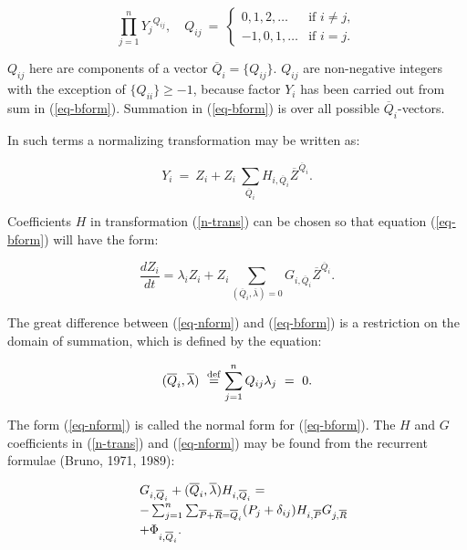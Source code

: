 $$
\prod_{j=1}^{n} {Y_j}^{Q_{ij}}, \quad
Q_{ij}\ =\ \left\{ \begin{array}{ll}
                    0,1,2,\ldots & \mbox{if $i\not =j,$} \\
                    -1,0,1,\ldots & \mbox{if $i=j.$}
                   \end{array}
           \right.
$$

$Q_{ij}$ here are components of a vector $\overline{Q}_i=\{Q_{ij}\}$.
$Q_{ij}$ are non-negative integers  with the exception of 
$\{Q_{ii}\} \geq -1$,  because factor $Y_i$ has been carried out from 
sum in (\ref{eq-bform}). Summation in (\ref{eq-bform}) is over all 
possible $\overline{Q}_i$-vectors.

    In such terms a normalizing transformation may be written as:

\begin{equation}
\label{n-trans}
Y_i\ =\ Z_i + Z_i \ \sum_{\overline{Q}_i}
H_{i,\overline{Q}_i} \overline{Z}^{\overline{Q}_i}.
\end{equation}

    Coefficients $H$ in transformation (\ref{n-trans}) can be chosen so
that equation (\ref{eq-bform}) will have the form:

\begin{equation}
\label{eq-nform}
\frac{dZ_i}{dt} =  \lambda_i Z_i + Z_i \sum_{(\overline{Q}_i,
\overline{\lambda})=0} G_{i,\overline{Q}_i} \overline{Z}^{\overline{Q}_i}.
\end{equation}
\vspace{0.07in}

    The great  difference between (\ref{eq-nform}) and (\ref{eq-bform}) 
is a restriction on the domain of summation, which is defined by the 
equation:

\begin{equation}
\label{sc-prod}
(\overline{Q}_i,\overline{\lambda})\ \stackrel{\rm def}{=} \sum_{j=1}^{n} 
Q_{ij}\lambda_j\ =\ 0.
\end{equation}

   The form (\ref{eq-nform}) is called the normal form for 
(\ref{eq-bform}). The $H$ and $G$ coefficients in (\ref{n-trans})  
and (\ref{eq-nform}) may be found  from the recurrent formulae 
(Bruno, 1971, 1989):

\begin{equation}
\label{rec-norm-trans}
\begin{array}{ll}
&G_{i,\overline{Q}_i}  +  (\overline{Q}_i,\overline{\lambda})
H_{\mathstrut \mathstrut \mathstrut i,\overline{Q}_i}= \\
&-  \sum_{\mathstrut \mathstrut \mathstrut j=1}
        ^{\mathstrut \mathstrut \mathstrut n}
\sum_{\overline{P}+\overline{R}=\overline{Q}_i}
 (P_j+ \delta _{ij})H_{i,\overline{P}}G_{j,\overline{R}} \\
&+\Phi_{i,\overline{Q}_i}^{\mathstrut \mathstrut \mathstrut \ }.
\end{array}
\end{equation}

